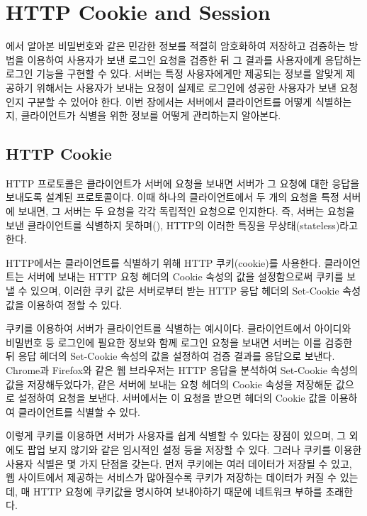 \section{HTTP Cookie and Session}\label{sect:cookie-session}

에서 알아본 비밀번호와 같은 민감한 정보를 적절히 암호화하여 저장하고 검증하는 방법을 이용하여 사용자가 보낸 로그인 요청을 검증한 뒤 그 결과를 사용자에게 응답하는 로그인 기능을 구현할 수 있다. 서버는 특정 사용자에게만 제공되는 정보를 알맞게 제공하기 위해서는 사용자가 보내는 요청이 실제로 로그인에 성공한 사용자가 보낸 요청인지 구분할 수 있어야 한다. 이번 장에서는 서버에서 클라이언트를 어떻게 식별하는지, 클라이언트가 식별을 위한 정보를 어떻게 관리하는지 알아본다.

\subsection*{HTTP Cookie}

HTTP 프로토콜은 클라이언트가 서버에 요청을 보내면 서버가 그 요청에 대한 응답을 보내도록 설계된 프로토콜이다. 이때 하나의 클라이언트에서 두 개의 요청을 특정 서버에 보내면, 그 서버는 두 요청을 각각 독립적인 요청으로 인지한다. 즉, 서버는 요청을 보낸 클라이언트를 식별하지 못하며(), HTTP의 이러한 특징을 무상태(stateless)라고 한다.

HTTP에서는 클라이언트를 식별하기 위해 HTTP 쿠키(cookie)를 사용한다. 클라이언트는 서버에 보내는 HTTP 요청 헤더의 Cookie 속성의 값을 설정함으로써 쿠키를 보낼 수 있으며, 이러한 쿠키 값은 서버로부터 받는 HTTP 응답 헤더의 Set-Cookie 속성값을 이용하여 정할 수 있다.

\는 쿠키를 이용하여 서버가 클라이언트를 식별하는 예시이다. 클라이언트에서 아이디와 비밀번호 등 로그인에 필요한 정보와 함께 로그인 요청을 보내면 서버는 이를 검증한 뒤 응답 헤더의 Set-Cookie 속성의 값을 설정하여 검증 결과를 응답으로 보낸다. Chrome과 Firefox와 같은 웹 브라우저는 HTTP 응답을 분석하여 Set-Cookie 속성의 값을 저장해두었다가, 같은 서버에 보내는 요청 헤더의 Cookie 속성을 저장해둔 값으로 설정하여 요청을 보낸다. 서버에서는 이 요청을 받으면 헤더의 Cookie 값을 이용하여 클라이언트를 식별할 수 있다.

이렇게 쿠키를 이용하면 서버가 사용자를 쉽게 식별할 수 있다는 장점이 있으며, 그 외에도 팝업 보지 않기와 같은 임시적인 설정 등을 저장할 수 있다. 그러나 쿠키를 이용한 사용자 식별은 몇 가지 단점을 갖는다. 먼저 쿠키에는 여러 데이터가 저장될 수 있고, 웹 사이트에서 제공하는 서비스가 많아질수록 쿠키가 저장하는 데이터가 커질 수 있는데, 매 HTTP 요청에 쿠키값을 명시하여 보내야하기 때문에 네트워크 부하를 초래한다.

